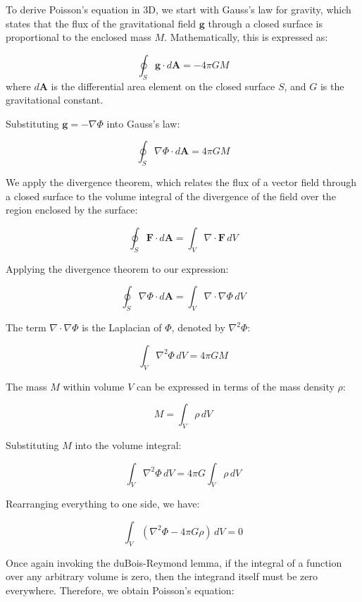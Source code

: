\documentclass[notoc]{tufte-handout}
\begin{document}
To derive Poisson's equation in 3D, we start with Gauss's law for gravity, which states that the flux of the gravitational field $\mathbf{g}$ through a closed surface is proportional to the enclosed mass $M$. Mathematically, this is expressed as:

\[
\oint_S \mathbf{g} \cdot d\mathbf{A} = -4 \pi G M
\]
%
where $d\mathbf{A}$ is the differential area element on the closed surface $S$, and $G$ is the gravitational constant.

Substituting $\mathbf{g} = -\nabla \Phi$ into Gauss's law:

\[
\oint_S \nabla \Phi \cdot d\mathbf{A} = 4 \pi G M
\]

We apply the divergence theorem, which relates the flux of a vector field through a closed surface to the volume integral of the divergence of the field over the region enclosed by the surface:

\[
\oint_S \mathbf{F} \cdot d\mathbf{A} = \int_V \nabla \cdot \mathbf{F} \, dV
\]

Applying the divergence theorem to our expression:

\[
\oint_S \nabla \Phi \cdot d\mathbf{A} = \int_V \nabla \cdot \nabla \Phi \, dV
\]

The term $\nabla \cdot \nabla \Phi$ is the Laplacian of $\Phi$, denoted by $\nabla^2 \Phi$:

\[
\int_V \nabla^2 \Phi \, dV = 4 \pi G M
\]

The mass $M$ within volume $V$ can be expressed in terms of the mass density $\rho$:

\[
M = \int_V \rho \, dV
\]

Substituting $M$ into the volume integral:

\[
\int_V \nabla^2 \Phi \, dV = 4 \pi G \int_V \rho \, dV
\]

Rearranging everything to one side, we have:

\[
\int_V (\nabla^2 \Phi - 4 \pi G \rho) \, dV = 0
\]

Once again invoking  the duBois-Reymond lemma, if the integral of a function over any arbitrary volume is zero, then the integrand itself must be zero everywhere. Therefore, we obtain Poisson's equation:
\end{document}
